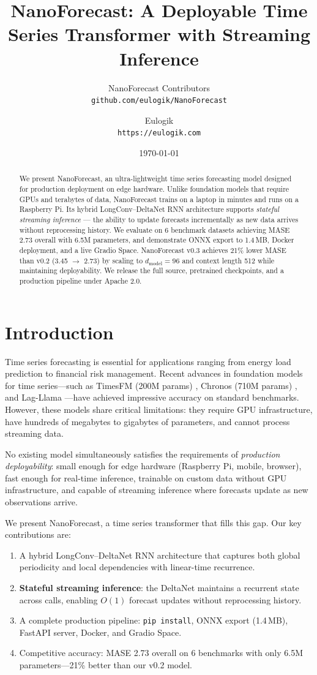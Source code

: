\documentclass[11pt]{article}
\title{NanoForecast: A Deployable Time Series Transformer with Streaming Inference}
\author{NanoForecast Contributors \\
\texttt{github.com/eulogik/NanoForecast} \\
\and
Eulogik \\
\texttt{https://eulogik.com}
}
\date{\today}
\begin{document}
\begin{abstract}
We present NanoForecast, an ultra-lightweight time series forecasting model designed for production deployment on edge hardware. Unlike foundation models that require GPUs and terabytes of data, NanoForecast trains on a laptop in minutes and runs on a Raspberry Pi. Its hybrid LongConv--DeltaNet RNN architecture supports \emph{stateful streaming inference} --- the ability to update forecasts incrementally as new data arrives without reprocessing history. We evaluate on 6 benchmark datasets achieving MASE 2.73 overall with 6.5M parameters, and demonstrate ONNX export to 1.4\,MB, Docker deployment, and a live Gradio Space. NanoForecast v0.3 achieves 21\% lower MASE than v0.2 (3.45 $\to$ 2.73) by scaling to $d_{\text{model}}=96$ and context length 512 while maintaining deployability. We release the full source, pretrained checkpoints, and a production pipeline under Apache 2.0.
\end{abstract}

\section{Introduction}

Time series forecasting is essential for applications ranging from energy load prediction to financial risk management. Recent advances in foundation models for time series---such as TimesFM (200M params) \cite{timesfm}, Chronos (710M params) \cite{chronos}, and Lag-Llama \cite{lagllama}---have achieved impressive accuracy on standard benchmarks. However, these models share critical limitations: they require GPU infrastructure, have hundreds of megabytes to gigabytes of parameters, and cannot process streaming data.

No existing model simultaneously satisfies the requirements of \emph{production deployability}: small enough for edge hardware (Raspberry Pi, mobile, browser), fast enough for real-time inference, trainable on custom data without GPU infrastructure, and capable of streaming inference where forecasts update as new observations arrive.

We present NanoForecast, a time series transformer that fills this gap. Our key contributions are:
\begin{enumerate}
    \item A hybrid LongConv--DeltaNet RNN architecture that captures both global periodicity and local dependencies with linear-time recurrence.
    \item \textbf{Stateful streaming inference}: the DeltaNet maintains a recurrent state across calls, enabling $O(1)$ forecast updates without reprocessing history.
    \item A complete production pipeline: \texttt{pip install}, ONNX export (1.4\,MB), FastAPI server, Docker, and Gradio Space.
    \item Competitive accuracy: MASE 2.73 overall on 6 benchmarks with only 6.5M parameters---21\% better than our v0.2 model.
\end{enumerate}
\end{document}
